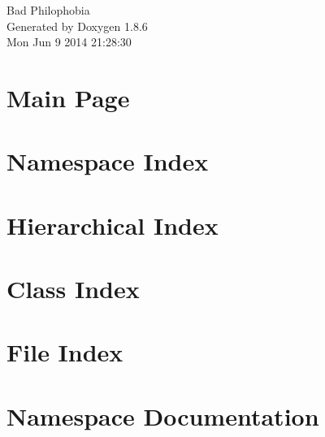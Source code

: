 \documentclass[twoside]{book}
\newcommand{\clearemptydoublepage}{%
  \newpage{\pagestyle{empty}\cleardoublepage}%
}
\begin{document}
\hypersetup{pageanchor=false}
\begin{titlepage}
\vspace*{7cm}
\begin{center}%
{\Large Bad Philophobia }\\
\vspace*{1cm}
{\large Generated by Doxygen 1.8.6}\\
\vspace*{0.5cm}
{\small Mon Jun 9 2014 21:28:30}\\
\end{center}
\end{titlepage}
\clearemptydoublepage
\tableofcontents
\clearemptydoublepage
{}
\hypersetup{pageanchor=true}

\chapter{Main Page}
\label{index}\hypertarget{index}{}
\chapter{Namespace Index}

\chapter{Hierarchical Index}

\chapter{Class Index}

\chapter{File Index}

\chapter{Namespace Documentation}







\end{document}
